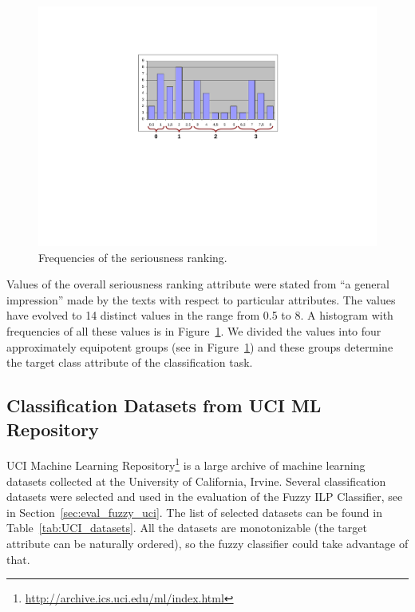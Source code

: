 \begin{figure}
\centerline{\includegraphics[angle=-90, width=0.6\hsize]{ranking_histogram}}
\caption{Frequencies of the seriousness ranking.}
\label{img:ch40_ranking_histogram}
\end{figure}

Values of the overall seriousness ranking attribute were stated from ``a general impression'' made by the texts with respect to particular attributes. %
The values have evolved to 14 distinct values in the range from 0.5 to 8. 
A histogram with frequencies of all these values is in Figure~\ref{img:ch40_ranking_histogram}.
We divided the values into four approximately equipotent groups 
(see in Figure~\ref{img:ch40_ranking_histogram}) 
and these groups determine the target class attribute of the classification task. 






\subsection{Classification Datasets from UCI ML Repository} \label{sec:ch40_uci_datasets}

UCI Machine Learning Repository\footnote{\url{http://archive.ics.uci.edu/ml/index.html}} \citep{biblio:UCI} is a large archive of machine learning datasets collected at the University of California, Irvine. Several classification datasets were selected and used in the evaluation of the Fuzzy ILP Classifier, see in Section~\ref{sec:eval_fuzzy_uci}.
The list of selected datasets can be found in Table~\ref{tab:UCI_datasets}. All the datasets are monotonizable (the target attribute can be naturally ordered), so the fuzzy classifier could take advantage of that.


